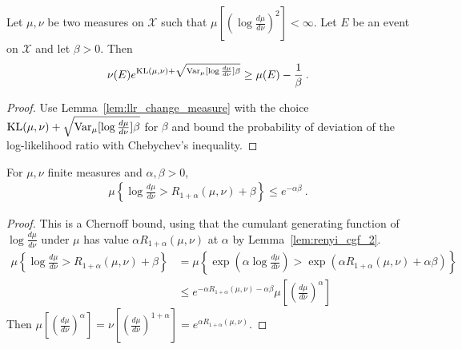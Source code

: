 \begin{lemma}
  \label{lem:llr_change_measure_variance}
  \uses{}
  Let $\mu, \nu$ be two measures on $\mathcal X$ such that $\mu\left[\left(\log\frac{d \mu}{d \nu}\right)^2\right] < \infty$. Let $E$ be an event on $\mathcal X$ and let $\beta > 0$. Then
  \begin{align*}
  \nu(E) e^{\operatorname{KL}(\mu, \nu) + \sqrt{\operatorname{Var}_\mu[\log\frac{d \mu}{d \nu}]\beta}} \ge \mu(E) - \frac{1}{\beta} \: .
  \end{align*}
\end{lemma}

\begin{proof}%
{}
Use Lemma~\ref{lem:llr_change_measure} with the choice $\operatorname{KL}(\mu, \nu) + \sqrt{\operatorname{Var}_\mu[\log\frac{d \mu}{d \nu}]\beta}$ for $\beta$ and bound the probability of deviation of the log-likelihood ratio with Chebychev's inequality.
\end{proof}

\begin{lemma}
  \label{lem:renyi_chernoff_bound}
  \leanok
  For $\mu, \nu$ finite measures and $\alpha, \beta > 0$,
  \begin{align*}
  \mu\left\{ \log\frac{d \mu}{d \nu} > R_{1+\alpha}(\mu, \nu) + \beta \right\}
  \le e^{- \alpha \beta}
  \: .
  \end{align*}
\end{lemma}

\begin{proof}\leanok
{}
This is a Chernoff bound, using that the cumulant generating function of $\log\frac{d\mu}{d\nu}$ under $\mu$ has value $\alpha R_{1+\alpha}(\mu, \nu)$ at $\alpha$ by Lemma~\ref{lem:renyi_cgf_2}.
\begin{align*}
\mu\left\{ \log\frac{d \mu}{d \nu} > R_{1+\alpha}(\mu, \nu) + \beta \right\}
&= \mu\left\{ \exp\left(\alpha\log\frac{d \mu}{d \nu}\right) > \exp\left(\alpha R_{1+\alpha}(\mu, \nu) + \alpha \beta\right) \right\}
\\
&\le e^{-\alpha R_{1+\alpha}(\mu, \nu) - \alpha \beta} \mu\left[\left(\frac{d \mu}{d \nu}\right)^\alpha \right]
\end{align*}
Then $\mu\left[\left(\frac{d \mu}{d \nu}\right)^\alpha \right] = \nu\left[\left(\frac{d \mu}{d \nu}\right)^{1+\alpha} \right] = e^{\alpha R_{1+\alpha}(\mu, \nu)}$.
\end{proof}



